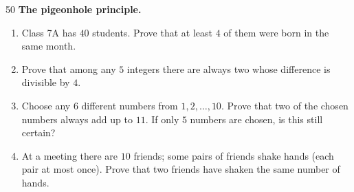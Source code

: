 \begin{probbox}{50}{}
\textbf{The pigeonhole principle.}
\begin{enumerate}[label=\alph*),leftmargin=1.6em,itemsep=1pt,topsep=2pt]
  \item Class 7A has $40$ students. Prove that at least $4$ of them were born in the same month.
  \item Prove that among any $5$ integers there are always two whose difference is divisible by $4$.
  \item Choose any $6$ different numbers from $1, 2, \dots, 10$. Prove that two of the chosen numbers always add up to $11$. If only $5$
  numbers are chosen, is this still certain?
  \item At a meeting there are $10$ friends; some pairs of friends shake hands (each pair at most once). Prove that two friends have
  shaken the same number of hands.
\end{enumerate}
\end{probbox}
